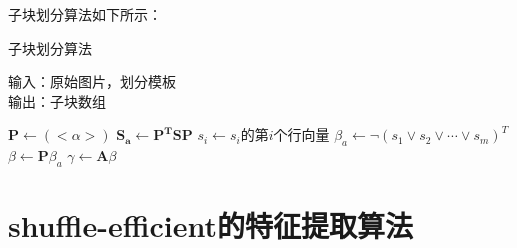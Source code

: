 子块划分算法如下所示：
\begin{algorithm}[htbp]
  \caption{子块划分算法}
  \label{algDiveModel}
  输入：原始图片，划分模板\\
  输出：子块数组
  \begin{algorithmic}[1]
    \STATE $\mathbf{P}\leftarrow\left(<\alpha>\right)$
    \STATE $\mathbf{S_{a}}\leftarrow\mathbf{P^T}\mathbf{S}\mathbf{P}$
    \STATE $s_i\leftarrow s_i$的第$i$个行向量
    \ENDFOR
    \STATE $\beta_a\leftarrow\lnot \left(s_1\lor s_2\lor \cdots\lor s_m\right)^T$
    \STATE $\beta\leftarrow\mathbf{P}\beta_a$
    \STATE $\gamma\leftarrow\mathbf{A}\beta$
  \end{algorithmic}
\end{algorithm}
\section{shuffle-efficient的特征提取算法}
